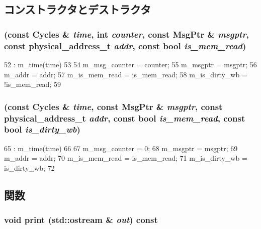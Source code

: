 \subsection{コンストラクタとデストラクタ}
\hypertarget{classMemoryNode_a2ca4c85a990bb6c3970c66f977b8dc50}{
\subsubsection[{MemoryNode}]{ (const {\bf Cycles} \& {\em time}, \/  int {\em counter}, \/  const {\bf MsgPtr} \& {\em msgptr}, \/  const {\bf physical\_\-address\_\-t} {\em addr}, \/  const bool {\em is\_\-mem\_\-read})}}
\label{classMemoryNode_a2ca4c85a990bb6c3970c66f977b8dc50}



\begin{DoxyCode}
52         : m_time(time)
53     {
54         m_msg_counter = counter;
55         m_msgptr = msgptr;
56         m_addr = addr;
57         m_is_mem_read = is_mem_read;
58         m_is_dirty_wb = !is_mem_read;
59     }
\end{DoxyCode}
\hypertarget{classMemoryNode_a38258165f21c162baa85ffad137fb8d2}{
\subsubsection[{MemoryNode}]{ (const {\bf Cycles} \& {\em time}, \/  const {\bf MsgPtr} \& {\em msgptr}, \/  const {\bf physical\_\-address\_\-t} {\em addr}, \/  const bool {\em is\_\-mem\_\-read}, \/  const bool {\em is\_\-dirty\_\-wb})}}
\label{classMemoryNode_a38258165f21c162baa85ffad137fb8d2}



\begin{DoxyCode}
65         : m_time(time)
66     {
67         m_msg_counter = 0;
68         m_msgptr = msgptr;
69         m_addr = addr;
70         m_is_mem_read = is_mem_read;
71         m_is_dirty_wb = is_dirty_wb;
72     }
\end{DoxyCode}


\subsection{関数}
\hypertarget{classMemoryNode_ac55fe386a101fbae38c716067c9966a0}{
\subsubsection[{print}]{\setlength{\rightskip}{0pt plus 5cm}void print (std::ostream \& {\em out}) const}}
\label{classMemoryNode_ac55fe386a101fbae38c716067c9966a0}


